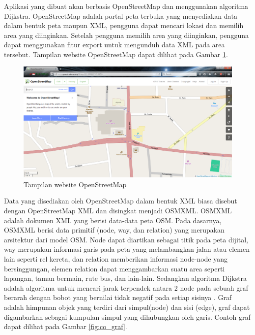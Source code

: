 Aplikasi yang dibuat akan berbasis OpenStreetMap dan menggunakan 
algoritma Dijkstra. OpenStreetMap adalah portal peta terbuka yang menyediakan data dalam bentuk 
peta maupun XML, pengguna dapat mencari lokasi dan memilih area yang
diinginkan. Setelah pengguna memilih area yang diinginkan, pengguna dapat menggunakan
fitur export untuk mengunduh data XML pada area tersebut. Tampilan website
OpenStreetMap dapat dilihat pada Gambar \ref{fig:web_osm}.
\begin{figure}[h]
\centering
\includegraphics[scale=0.3]{Gambar/web_osm}
\caption[Tampilan website OpenStreetMap]{Tampilan website OpenStreetMap
\footnotemark[1]}
\label{fig:web_osm}
\end{figure}
Data yang
disediakan oleh OpenStreetMap dalam bentuk XML biasa disebut
dengan OpenStreetMap XML dan disingkat menjadi OSMXML. OSMXML adalah dokumen XML
yang berisi data-data peta OSM. Pada dasarnya, OSMXML berisi data primitif
(node, way, dan relation) yang merupakan arsitektur dari model OSM. Node
dapat diartikan sebagai titik pada peta dijital, way merupakan informasi garis
pada peta yang melambangkan jalan atau elemen lain seperti rel kereta, dan
relation memberikan informasi node-node yang bersinggungan, elemen
relation dapat menggambarkan suatu area seperti lapangan, taman bermain, rute
bus, dan lain-lain. Sedangkan algoritma Dijkstra
adalah algoritma untuk mencari jarak terpendek antara 2 node pada sebuah graf
berarah dengan bobot yang bernilai tidak negatif pada setiap sisinya \cite{Cormen:2001}. Graf adalah himpunan objek yang terdiri dari simpul(node)
dan sisi (edge), graf dapat digambarkan sebagai kumpulan simpul yang dihubungkan
oleh garis.
Contoh graf dapat dilihat pada Gambar \ref{fig:co_graf}.
